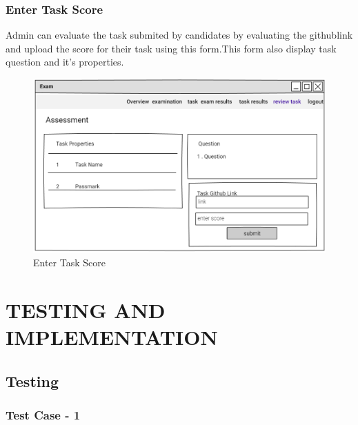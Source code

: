 \documentclass[a4paper,12pt]{report}
\begin{document}
\subsection {  Enter Task Score}
Admin can evaluate the task submited by candidates by evaluating the githublink and upload the score for their task using this form.This form also display task question and it's properties.
\begin{figure}[bph]
	\centering
	\includegraphics[width=.8\linewidth]{img/admin/rvwtsk3}
	\caption{Enter Task Score}
\end{figure}

\pagebreak

\chapter{TESTING AND IMPLEMENTATION}

\section{Testing}
\subsection{Test Case - 1 }
\end{document}
